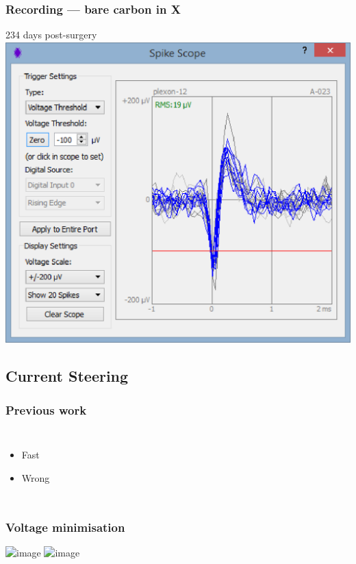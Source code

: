 \documentclass{beamer}
\begin{document}
\begin{frame}
  \frametitle{Recording --- bare carbon in X}
  234 days post-surgery
  \includegraphics[height=\textheight]{lw85ry_x}
\end{frame}


\subsection{Current Steering}


\begin{frame}
  \frametitle{Previous work}
  \begin{columns}
    \column{5cm}
    \column{5cm}
    \begin{itemize}
    \item Fast
    \item Wrong
    \end{itemize}
  \end{columns}
\end{frame}


\begin{frame}
  \frametitle{Voltage minimisation}
  \includegraphics<+>[width=\textwidth]{current_steering_voltages}
  \includegraphics<+>[width=\textwidth]{current_steering_voltages_valid}
\end{frame}
\end{document}
